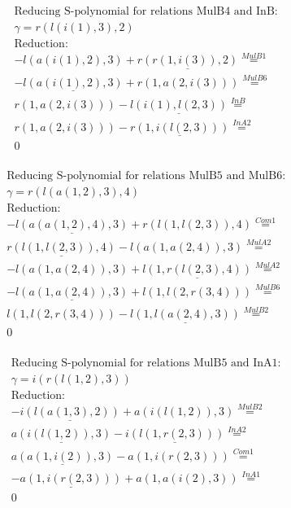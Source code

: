 \documentclass[11pt]{amsart}
\begin{document}
\begin{align*} 
& \text{Reducing S-polynomial for relations MulB4 and InB:} \\ 
& \gamma = r(l(i(1),3),2) \\ 
& \text{Reduction}: \\& - l(a(i(1),2),3) + \underline{r(r(1,i(3)),2)} \stackrel{ MulB1 }{=}  \\ 
& - \underline{l(a(i(1),2),3)} + r(1,a(2,i(3))) \stackrel{ MulB6 }{=}  \\ 
&r(1,a(2,i(3))) - \underline{l(i(1),l(2,3))} \stackrel{ InB }{=}  \\ 
&r(1,a(2,i(3))) - \underline{r(1,i(l(2,3)))} \stackrel{ InA2 }{=}  \\ 
&0\\ 
\end{align*} 
 
\begin{align*} 
& \text{Reducing S-polynomial for relations MulB5 and MulB6:} \\ 
& \gamma = r(l(a(1,2),3),4) \\ 
& \text{Reduction}: \\& - \underline{l(a(a(1,2),4),3)} + r(l(1,l(2,3)),4) \stackrel{ Com1 }{=}  \\ 
&\underline{r(l(1,l(2,3)),4)} - l(a(1,a(2,4)),3) \stackrel{ MulA2 }{=}  \\ 
& - l(a(1,a(2,4)),3) + \underline{l(1,r(l(2,3),4))} \stackrel{ MulA2 }{=}  \\ 
& - \underline{l(a(1,a(2,4)),3)} + l(1,l(2,r(3,4))) \stackrel{ MulB6 }{=}  \\ 
&l(1,l(2,r(3,4))) - \underline{l(1,l(a(2,4),3))} \stackrel{ MulB2 }{=}  \\ 
&0\\ 
\end{align*} 
 
\begin{align*} 
& \text{Reducing S-polynomial for relations MulB5 and InA1:} \\ 
& \gamma = i(r(l(1,2),3)) \\ 
& \text{Reduction}: \\& - \underline{i(l(a(1,3),2))} + a(i(l(1,2)),3) \stackrel{ MulB2 }{=}  \\ 
&\underline{a(i(l(1,2)),3)} - \underline{i(l(1,r(2,3)))} \stackrel{ InA2 }{=}  \\ 
&\underline{a(a(1,i(2)),3)} - a(1,i(r(2,3))) \stackrel{ Com1 }{=}  \\ 
& - \underline{a(1,i(r(2,3)))} + a(1,a(i(2),3)) \stackrel{ InA1 }{=}  \\ 
&0\\ 
\end{align*} 
 
\end{document}
